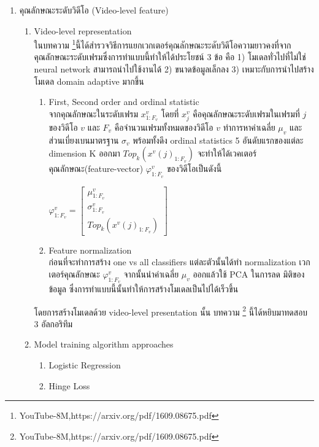 \begin{enumerate}
\begin{enumerate}
\begin{figure}[!ht]
    			\label{fig:BSS}
		\end{figure}
	\end{enumerate}
	\item คุณลักษณะระดับวิดีโอ (Video-level feature)
	\begin{enumerate}
		\setlength\itemsep{-0.25em}
		\item Video-level representation 
		\\ ในบทความ \footnote{YouTube-8M,https://arxiv.org/pdf/1609.08675.pdf}นี้ได้สำรวจวิธีการแยกเวกเตอร์คุณลักษณะระดับวิดีโอความยาวคงที่จากคุณลักษณะระดับเฟรมซึ่งการทำแบบนี้ทำให้ได้ประโยชน์ 3 ข้อ คือ 1) โมเดลทั่วไปที่ไม่ใช่ neural network สามารถนำไปใช้งานได้  2) ขนาดข้อมูลเล็กลง  3) เหมาะกับการนำไปสร้างโมเดล domain adaptive มากขึ้น
		\begin{enumerate}
			\setlength\itemsep{-0.25em}
			\item First, Second order and ordinal statistic
			\\ จากคุณลักษณะในระดับเฟรม $x_{1:F_{v}}^{v}$ โดยที่ $x_{j}^{v}$ คือคุณลักษณะระดับเฟรมในเฟรมที่ $j$ ของวิดีโอ $v$ และ $F_{v}$ คือจำนวนเฟรมทั้งหมดของวิดีโอ $v$ ทำการหาค่าเฉลี่ย $\mu_{v}$ และส่วนเบี่ยงเบนมาตรฐาน $\sigma_{v}$ พร้อมทั้งดึง ordinal statistics 5 อันดับแรกของแต่ละ dimension K ออกมา $Top_{k}(x^{v}(j)_{1:F_{v}})$ จะทำให้ได้เวคเตอร์คุณลักษณะ(feature-vector) $\varphi_{1:F_{v}}^{v}$ ของวิดีโอเป็นดังนี้ \\
			\centerline{$\varphi_{1:F_{v}}^{v} = \begin{bmatrix}
								\mu_{1:F_{v}}^{v}\\ 
								\sigma_{1:F_{v}}^{v}\\ 
								Top_{k}(x^{v}(j)_{1:F_{v}})
								\end{bmatrix}$}
			\item Feature normalization \\
			ก่อนที่จะทำการสร้าง one vs all classifiers แต่ละตัวนั้นได้ทำ normalization เวกเตอร์คุณลักษณะ $\varphi_{1:F_{v}}^{v}$ จากนั้นนำค่าเฉลี่ย $\mu_{v}$ ออกแล้วใช้ PCA ในการลด มิติของข้อมูล ซึ่งการทำแบบนี้นั้นทำให้การสร้างโมเดลเป็นไปได้เร็วขึ้น
		\end{enumerate}
		โดยการสร้างโมเดลด้วย video-level presentation นั้น บทความ \footnote{YouTube-8M,https://arxiv.org/pdf/1609.08675.pdf} นี้ได้หยิบมาทดสอบ 3 อัลกอริทึม
		\item Model training algorithm approaches 
		\begin{enumerate}
			\setlength\itemsep{-0.25em}
			\item Logistic Regression
			\item Hinge Loss

\end{enumerate}
\end{enumerate}
\end{enumerate}
